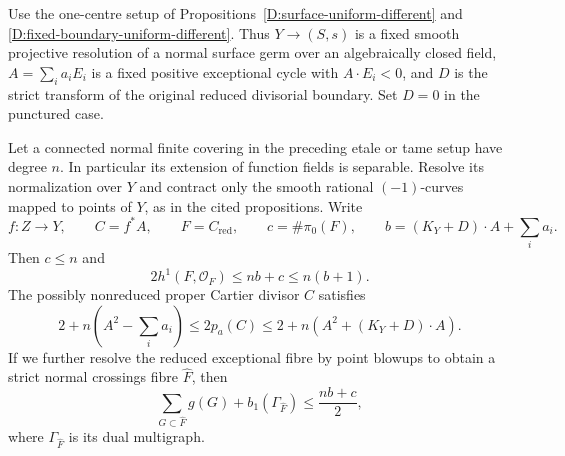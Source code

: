 \begin{proposition}
\label{D:exceptional-arithmetic-genus-bound}
Use the one-centre setup of
Propositions~\ref{D:surface-uniform-different} and
\ref{D:fixed-boundary-uniform-different}. Thus $Y\to(S,s)$ is a
fixed smooth projective resolution of a normal surface germ over
an algebraically closed field, $A=\sum_i a_iE_i$ is a fixed
positive exceptional cycle with $A\cdot E_i<0$, and $D$ is the
strict transform of the original reduced divisorial boundary.
Set $D=0$ in the punctured case.

Let a connected normal finite covering in the preceding
etale or tame setup have degree $n$. In particular its extension
of function fields is separable. Resolve its normalization over
$Y$ and contract only the smooth rational $(-1)$-curves mapped
to points of $Y$, as in the cited propositions. Write
\[
 f:Z\longrightarrow Y,\qquad C=f^*A,\qquad
 F=C_{\mathrm{red}},\qquad c=\#\pi_0(F),\qquad
 b=(K_Y+D)\cdot A+\sum_i a_i.
\]
Then $c\le n$ and
\[
             2h^1(F,\mathcal O_F)\le nb+c\le n(b+1).    \tag{D.AG.1}
\]
The possibly nonreduced proper Cartier divisor $C$ satisfies
\[
 2+n\left(A^2-\sum_i a_i\right)
 \le 2p_a(C)
 \le 2+n\left(A^2+(K_Y+D)\cdot A\right).               \tag{D.AG.2}
\]
If we further resolve the reduced exceptional fibre by point
blowups to obtain a strict normal crossings fibre $\widehat F$,
then
\[
 \sum_{G\subset\widehat F}g(G)+b_1(\Gamma_{\widehat F})
                   \le \frac{nb+c}{2},                 \tag{D.AG.3}
\]
where $\Gamma_{\widehat F}$ is its dual multigraph.
\end{proposition}
